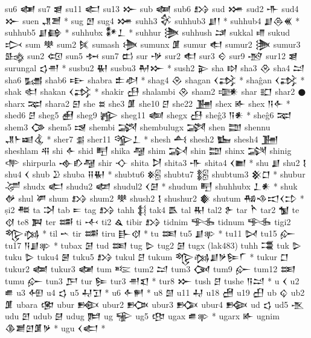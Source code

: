  su6  𒅾   
 su7  𒇭   
 su11  𒅗   
 su13  𒁍   
 sub  𒅢   
 sub6  𒋳   
 sud  𒋤   
 sud2  𒋥   
 sud4  𒁍   
 suen  𒂗𒍪 *   
 sug  𒆹   
 sug4  𒋤   
 suhh3  𒄗   
 suhhub3  𒋗𒁹 *   
 suhhub4  𒋗𒁲𒌍 *   
 suhhub5  𒋗𒂵 *   
 suhhubx  𒀯𒁇 *   
 suhhur  𒋦   
 suhhush  𒁼   
 sukkal  𒈛   
 sukud  𒃴   
 sum  𒋧   
 sum2  𒍮   
 sumash  𒋨   
 sumunx  𒂠   
 sumur  𒊨   
 sumur2  𒋦   
 sumur3  𒈰   
 sun2  𒄢   
 sun5  𒁔   
 sun7  𒆗   
 sur  𒋩   
 sur2  𒊨   
 sur3  𒄮   
 sur9  𒋪   
 sur12  𒇭   
 surungal  𒌓𒉣 *   
 susbu2  𒈽   
 susbu3  𒈹𒁍 *   
 sush2  𒉌   
 sha  𒊭   
 sha3  𒊮   
 sha4  𒁺   
 sha6  𒊷   
 shab6  𒊸   
 shabra  𒉺𒀠 *   
 shag4  𒊮   
 shagan  𒌋𒃶 *   
 shaĝan  𒌋𒃶 *   
 shak  𒊕   
 shakan  𒌋𒃶 *   
 shakir  𒍀   
 shalambi  𒊮   
 sham2  𒉛   
 shar  𒊬   
 shar2  𒊹   
 sharx  𒉈   
 shara2  𒇋   
 she  𒊺   
 she3  𒂠   
 she10  𒆪   
 she22  𒂞   
 shex  𒅊   
 shex  𒀀𒅆 *   
 shed6  𒆪   
 sheg5  𒍋   
 sheg9  𒊾   
 sheg11  𒅝   
 shegx  𒍀   
 sheĝ3  𒀀𒀭 *   
 sheĝ6  𒉈   
 shem3  𒀚   
 shem5  𒀎   
 shembi  𒋍   
 shembulugx  𒋎   
 shen  𒊿   
 shennu  𒂗𒈨𒀜𒆬 *   
 sher7  𒉪   
 sher11  𒄊𒁇 *   
 shesh  𒋀   
 shesh2  𒋁   
 shesh4  𒂞   
 sheshlam  𒋂   
 shi  𒅆   
 shid  𒋃   
 shika  𒆷   
 shim  𒋆   
 shin  𒊿   
 shinx  𒋋   
 shinig  𒋒   
 shirpurla   𒉢𒁓𒆷   
 shir  𒋓   
 shita  𒋖   
 shita3  𒋥   
 shita4  𒌋𒆤 *   
 shu  𒋗   
 shu2  𒋙   
 shu4  𒌋   
 shub  𒊒   
 shuba  𒍝𒈽 *   
 shubtu6  𒆝   
 shubtu7  𒆞   
 shubtum3  𒆜𒆸 *   
 shubur  𒋚   
 shudx  𒅗   
 shudu2  𒆃   
 shudul2  𒌋𒌆 *   
 shudum  𒋃   
 shuhhubx  𒁇𒀭 *   
 shuk  𒉻   
 shul  𒂄   
 shum  𒋳   
 shum2  𒋧   
 shush2  𒋙   
 shushur2  𒀽   
 shutum  𒄀𒈾𒀊𒌋𒄞 *   
 ṣi2  𒍣   
 ta  𒋫   
 tab  𒋰   
 tag  𒋳   
 tahh  𒈭   
 tak4  𒋺   
 tal  𒊑   
 tal2  𒉿   
 tar  𒋻   
 tar2  𒁯   
 te  𒋼   
 te8  𒀉   
 ter  𒌁   
 ti  𒋾   
 ti2  𒎗   
 tibir  𒋳   
 tidnim  𒊎   
 tidnum  𒊎   
 tigi2  𒈜𒁆 *   
 til  𒌀   
 tir  𒌁   
 tiru  𒃲𒋼 *   
 tu  𒌅   
 tu5  𒋗𒉀 *   
 tu11  𒄸   
 tu15  𒅎   
 tu17  𒀀𒋗𒉀 *   
 tubax  𒌆   
 tud  𒌅   
 tug  𒌇   
 tug2  𒌆   
 tugx  (lak483)   
 tuhh  𒂃   
 tuk  𒌇   
 tuku  𒌇   
 tuku4  𒇧   
 tuku5  𒋳   
 tukul  𒆪   
 tukum  𒈜𒁆𒋗𒃻𒌉𒇲 *   
 tukur  𒆸   
 tukur2  𒆁   
 tukur3  𒆈   
 tum  𒌈   
 tum2  𒁺   
 tum3  𒉐   
 tum9  𒅎   
 tum12  𒌅   
 tumu  𒅎   
 tun3  𒂅   
 tur  𒌉   
 tur3  𒉣𒇬 *   
 tur8  𒁍   
 tush  𒆪   
 tushe  𒀀𒁺 *   
 u  𒌋   
 u2  𒌑   
 u3  𒅇   
 u4  𒌓   
 u5  𒄷𒋛 *   
 u6  𒅆𒂍 *   
 u8  𒇇   
 u11  𒄷   
 u18  𒍇   
 u19  𒌷   
 ub  𒌒   
 ub2  𒂠   
 ubara  𒂬   
 ubur  𒁛   
 ubur2  𒁥   
 ubur3  𒁡   
 ubur4  𒁢   
 ud  𒌓   
 ud5  𒍚   
 udu  𒇻   
 udub  𒇛   
 udug  𒌜   
 ug  𒊌   
 ug5  𒂦   
 ugax  𒌑𒉀 *   
 ugarx  𒅊   
 ugnim  𒆠𒋢𒇻𒂠𒃻 *   
 ugu  𒌋𒅗 *   
